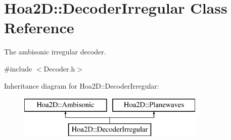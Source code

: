 \hypertarget{class_hoa2_d_1_1_decoder_irregular}{\section{Hoa2\-D\-:\-:Decoder\-Irregular Class Reference}
\label{class_hoa2_d_1_1_decoder_irregular}
}


The ambisonic irregular decoder.  




{\ttfamily \#include $<$Decoder.\-h$>$}

Inheritance diagram for Hoa2\-D\-:\-:Decoder\-Irregular\-:\begin{figure}[H]
\begin{center}
\leavevmode
\includegraphics[height=2.000000cm]{class_hoa2_d_1_1_decoder_irregular}
\end{center}
\end{figure}
